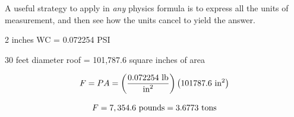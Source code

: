 \vskip 10pt

A useful strategy to apply in {\it any} physics formula is to express all the units of measurement, and then see how the units cancel to yield the answer.

\vskip 10pt

2 inches WC = 0.072254 PSI

30 feet diameter roof = 101,787.6 square inches of area

$$F = PA = \left( 0.072254 \hbox{ lb} \over \hbox{in}^2 \right) \left( 101787.6 \hbox{ in}^2 \right)$$

$$F = 7,354.6 \hbox{ pounds} = 3.6773 \hbox{ tons}$$




